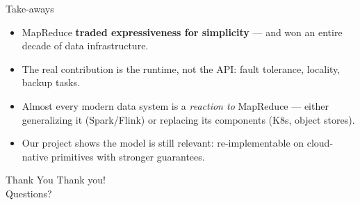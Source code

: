 \documentclass[11pt]{beamer}
\begin{document}
\begin{frame}{Take-aways}
\begin{itemize}
  \item MapReduce \textbf{traded expressiveness for simplicity} ---
        and won an entire decade of data infrastructure.
  \item The real contribution is the \alert{runtime}, not the API:
        fault tolerance, locality, backup tasks.
  \item Almost every modern data system is a \textit{reaction to} MapReduce ---
        either generalizing it (Spark/Flink) or replacing its components (K8s, object stores).
  \item Our project shows the model is still relevant: \alert{re-implementable
        on cloud-native primitives} with stronger guarantees.
\end{itemize}
\end{frame}

\begin{frame}{Thank You}
\centering
\Large Thank you! \\[0.8em]
\normalsize Questions?
\end{frame}
\end{document}
